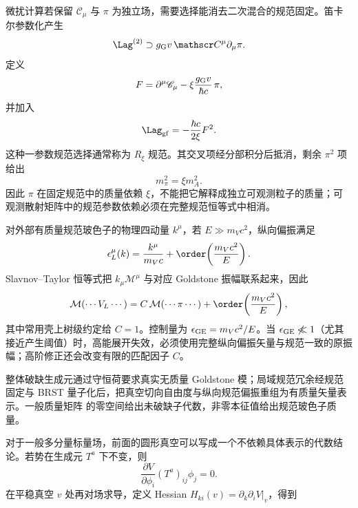 微扰计算若保留 $\mathscr C_\mu$ 与 $\pi$ 为独立场，需要选择能消去二次混合的规范固定。笛卡尔参数化产生
\begin{equation}
 \Lag^{(2)}\supset g_{\rm G}v\,\mathscr C^\mu\partial_\mu\pi.
 \label{eq:gauge-goldstone-mixing-dp11}
\end{equation}
定义
\begin{equation}
 {
 F=\partial^\mu\mathscr C_\mu
 -\xi\frac{g_{\rm G}v}{\hbar c}\,\pi,}
 \label{eq:rxi-gauge-functional-abelian-dp42}
\end{equation}
并加入
\begin{equation}
 \Lag_{\rm gf}
 =-\frac{\hbar c}{2\xi}F^2.
 \label{eq:rxi-abelian-gf-dp11}
\end{equation}
这种一参数规范选择通常称为 $R_\xi$ 规范。其交叉项经分部积分后抵消，剩余 $\pi^2$ 项给出
\begin{equation}
 {m_\pi^2=\xi m_A^2.}
 \label{eq:rxi-goldstone-mass-abelian-dp42}
\end{equation}
因此 $\pi$ 在固定规范中的质量依赖 $\xi$，不能把它解释成独立可观测粒子的质量；可观测散射矩阵中的规范参数依赖必须在完整规范恒等式中相消。

对外部有质量规范玻色子的物理四动量 \(k^\mu\)，若 \(E\gg m_Vc^2\)，纵向偏振满足
\begin{equation*}
 \epsilon_L^\mu(k)
 =\frac{k^\mu}{m_Vc}
 +\order\!\left(\frac{m_Vc^2}{E}\right).
\end{equation*}
Slavnov--Taylor 恒等式把 \(k_\mu\mathcal M^\mu\) 与对应 Goldstone 振幅联系起来，因此
\begin{equation}
 \mathcal M(\cdots V_L\cdots)
 =C\,\mathcal M(\cdots\pi\cdots)
 +\order\!\left(\frac{m_Vc^2}{E}\right),
 \label{eq:goldstone-equivalence-general-dp11}
\end{equation}
其中常用壳上树级约定给 \(C=1\)。控制量为 \(\epsilon_{\rm GE}=m_Vc^2/E\)。当 \(\epsilon_{\rm GE}\not\ll1\)（尤其接近产生阈值）时，高能展开失效，必须使用完整纵向偏振矢量与规范一致的原振幅；高阶修正还会改变有限的匹配因子 \(C\)。

整体破缺生成元通过守恒荷要求真实无质量 Goldstone 模；局域规范冗余经规范固定与 BRST 量子化后，把真空切向自由度与纵向规范偏振重组为有质量矢量表示。一般质量矩阵 的零空间给出未破缺子代数，非零本征值给出规范玻色子质量。

对于一般多分量标量场，前面的圆形真空可以写成一个不依赖具体表示的代数结论。若势在生成元 \(T^a\) 下不变，则
\begin{equation}
{
\frac{\partial V}{\partial\phi_i}(T^a)_{ij}\phi_j=0.}
\label{eq:ssb-general-potential-invariance-dp68}
\end{equation}
在平稳真空 \(v\) 处再对场求导，定义 Hessian \(H_{ki}(v)=\partial_k\partial_iV|_v\)，得到


